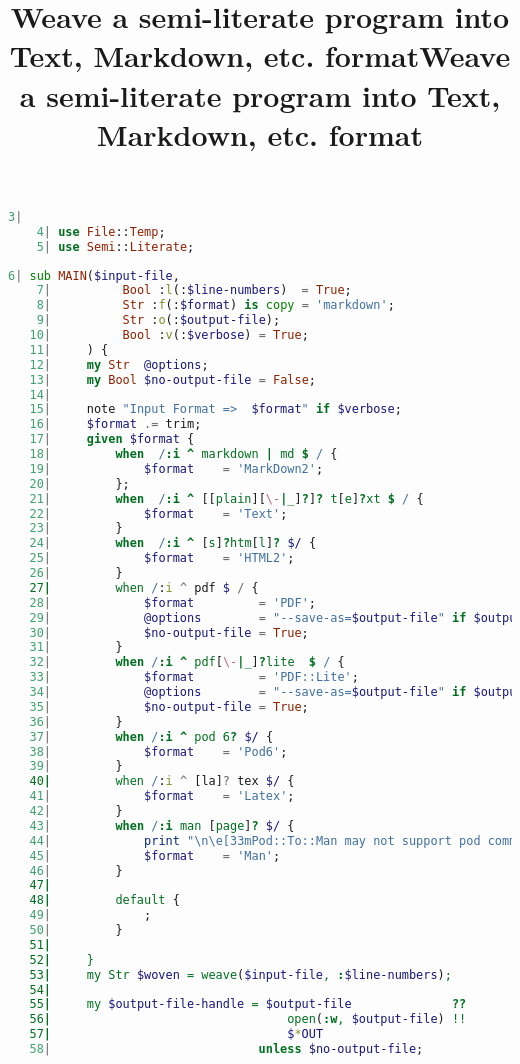 \documentclass{scrartcl}
\title{Weave a semi-literate program into Text, Markdown, etc. format}
\begin{document}
\maketitle
\begin{lstlisting}[language=Raku]
    3| 
    4| use File::Temp;
    5| use Semi::Literate;

\end{lstlisting}


\title{Weave a semi-literate program into Text, Markdown, etc. format}

\begin{lstlisting}[language=Raku]
    6| sub MAIN($input-file,
    7|          Bool :l(:$line-numbers)  = True;
    8|          Str :f(:$format) is copy = 'markdown';
    9|          Str :o(:$output-file);
   10|          Bool :v(:$verbose) = True;
   11|     ) {
   12|     my Str  @options;
   13|     my Bool $no-output-file = False;
   14| 
   15|     note "Input Format =>  $format" if $verbose;
   16|     $format .= trim;
   17|     given $format {
   18|         when  /:i ^ markdown | md $ / {
   19|             $format    = 'MarkDown2';
   20|         };
   21|         when  /:i ^ [[plain][\-|_]?]? t[e]?xt $ / {
   22|             $format    = 'Text';
   23|         }
   24|         when  /:i ^ [s]?htm[l]? $/ {
   25|             $format    = 'HTML2';
   26|         } 
   27|         when /:i ^ pdf $ / {
   28|             $format         = 'PDF';
   29|             @options        = "--save-as=$output-file" if $output-file;
   30|             $no-output-file = True;
   31|         }
   32|         when /:i ^ pdf[\-|_]?lite  $ / {
   33|             $format         = 'PDF::Lite';
   34|             @options        = "--save-as=$output-file" if $output-file;
   35|             $no-output-file = True;
   36|         }
   37|         when /:i ^ pod 6? $/ {
   38|             $format    = 'Pod6';
   39|         } 
   40|         when /:i ^ [la]? tex $/ {
   41|             $format    = 'Latex';
   42|         } 
   43|         when /:i man [page]? $/ {
   44|             print "\n\e[33mPod::To::Man may not support pod comment blocks...\e[0m";
   45|             $format    = 'Man';
   46|         } 
   47| 
   48|         default {
   49|             ; 
   50|         } 
   51| 
   52|     } 
   53|     my Str $woven = weave($input-file, :$line-numbers);
   54| 
   55|     my $output-file-handle = $output-file              ??
   56|                                 open(:w, $output-file) !!
   57|                                 $*OUT
   58|                             unless $no-output-file;

\end{lstlisting}
\end{document}
